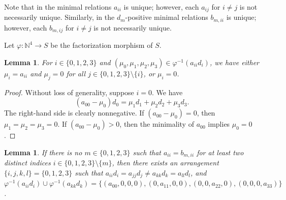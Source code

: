 \documentclass[12pt]{article}
\newtheorem{lemma}[thm]{Lemma}
\theoremstyle{remark}
\begin{document}
Note that in the minimal relations $a_{ii}$ is unique; however, each $a_{ij}$ for $i \neq j$ is not necessarily unique. Similarly, in the $d_m$-positive minimal relations $b_{m,ii}$ is unique; however, each $b_{m,ij}$ for $i \neq j$ is not necessarily unique.

Let $\varphi : \mathbb{N}^{4} \to S$ be the factorization morphism of $S$. 

\begin{lemma}\label{lemma_catenary_minrelations}
    For $i \in \{0,1,2,3\}$ and $(\mu_0,\mu_1,\mu_2,\mu_3) \in \varphi^{-1}( a_{ii}d_i)$, we have either $\mu_i = a_{ii}$ and $\mu_j = 0$ for all $j \in \{0,1,2,3\} \setminus \{i\}$, or $\mu_i = 0$.
\end{lemma}

\begin{proof}
     Without loss of generality, suppose $i=0$. We have
     \begin{equation}\label{lemma_catenary2_eq1}
         (a_{00}-\mu_0)d_0 =  \mu_1d_1 + \mu_2d_2 + \mu_3d_3.
     \end{equation}
     The right-hand side is clearly nonnegative. If $(a_{00}-\mu_0) = 0$, then $\mu_1 =\mu_2=\mu_3 = 0$.  If $(a_{00}-\mu_0) > 0$, then the minimality of $a_{00}$ implies $\mu_0 = 0$.
\end{proof}

\begin{lemma}\label{lemma2cases}
     If there is no $m \in \{0,1,2,3\}$ such that $a_{ii} = b_{m,ii}$ for at least two distinct indices $i \in \{0,1,2,3\} \setminus \{m\}$, then there exists an arrangement $\{i,j,k,l\} = \{0,1,2,3\}$ such that $a_{ii}d_i = a_{jj}d_j \neq a_{kk}d_k = a_{ll}d_l$, and $\varphi^{-1}(a_{ii}d_i) \cup \varphi^{-1}(a_{kk}d_k) =  \{(a_{00},0,0,0), (0,a_{11},0,0),(0,0,a_{22},0),(0,0,0,a_{33})\}$.
\end{lemma}
\end{document}
